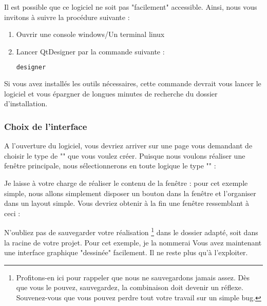 \documentclass[12pt]{report}    %
\begin{document}
Il est possible que ce logiciel ne soit pas "facilement" accessible. Ainsi, nous vous invitons à suivre la procédure suivante :
\begin{enumerate}
\item Ouvrir une console windows/Un terminal linux
\item Lancer QtDesigner par la commande suivante :
\begin{lstlisting}[language=bash]
designer
\end{lstlisting}
\end{enumerate}

Si vous avez installés les outils nécessaires, cette commande devrait vous lancer le logiciel et vous épargner de longues minutes de recherche du dossier d'installation.

\subsubsection{Choix de l'interface}

A l'ouverture du logiciel, vous devriez arriver sur une page vous demandant de choisir le type de "" que vous voulez créer.\newline
Puisque nous voulons réaliser une fenêtre principale, nous sélectionnerons en toute logique le type "\eType{\textcolor{red}{MainWindow}}" :


Je laisse à votre charge de réaliser le contenu de la fenêtre : pour cet exemple simple, nous allons simplement disposer un bouton dans la fenêtre et l'organiser dans un layout simple.\newline
Vous devriez obtenir à la fin une fenêtre ressemblant à ceci :


N'oubliez pas de sauvegarder votre réalisation
\footnote{
Profitons-en ici pour rappeler que nous ne sauvegardons jamais assez. Dès que vous le pouvez, sauvegardez, la combinaison \bold{\textcolor{red}{Ctrl+S}} doit devenir un réflexe. Souvenez-vous que vous pouvez perdre tout votre travail sur un simple bug.
}
dans le dossier adapté, soit  dans la racine de votre projet. Pour cet exemple, je la nommerai \newline
Vous avez maintenant une interface graphique "dessinée" facilement. Il ne reste plus qu'à l'exploiter.
\end{document}

